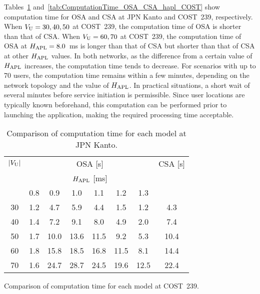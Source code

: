 \documentclass[10pt, letterpaper]{IEEEtran}
\begin{document}
\begin{CJK}{UTF8}{ipxm}
Tables~\ref{tab:ComputationTime_OSA_CSA_hapl_JPN} and~\ref{tab:ComputationTime_OSA_CSA_hapl_COST} show computation time for OSA and CSA at JPN Kanto and COST~239, respectively.
When $V_{\rm U} = 30, 40, 50$ at COST~239, the computation time of OSA is shorter than that of CSA.
When $V_{\rm U} = 60, 70$ at COST~239, the computation time of OSA at $H_{\rm APL} = 8.0$~ms is longer than that of CSA but shorter than that of CSA at other $H_{\rm APL}$ values.
In both networks, as the difference from a certain value of $H_{\rm APL}$ increases, the computation time tends to decrease.
For scenarios with up to 70 users, the computation time remains within a few minutes, depending on the network topology and the value of $H_{\rm APL}$. 
In practical situations, a short wait of several minutes before service initiation is permissible.
Since user locations are typically known beforehand, this computation can be performed prior to launching the application, making the required processing time acceptable.
\begin{table}[t]
  \caption{Comparison of computation time for each model at JPN Kanto.}
  \label{tab:ComputationTime_OSA_CSA_hapl_JPN}
  \begin{center}
    \begin{tabular}{c|cccccc|c}
      \hline
      $|V_{\rm{U}}|$ & \multicolumn{6}{c|}{OSA [s]} & CSA [s] \\ \cline{2-7}
       & \multicolumn{6}{c|}{$H_{\rm{APL}}$ [ms]} & \\
       & 0.8 & 0.9 & 1.0 & 1.1 & 1.2 & 1.3 &  \\
      \hline
      30 & 1.2 &  4.7 &  5.9 &  4.4 &  1.5 &  1.2 &  4.3 \\
      40 & 1.4 &  7.2 &  9.1 &  8.0 &  4.9 &  2.0 &  7.4 \\
      50 & 1.7 & 10.0 & 13.6 & 11.5 &  9.2 &  5.3 & 10.4 \\
      60 & 1.8 & 15.8 & 18.5 & 16.8 & 11.5 &  8.1 & 14.4 \\
      70 & 1.6 & 24.7 & 28.7 & 24.5 & 19.6 & 12.5 & 22.4 \\
      \hline
    \end{tabular}
  \end{center}
\end{table}
\begin{table}[t]
  \caption{Comparison of computation time for each model at COST~239.}
  \label{tab:ComputationTime_OSA_CSA_hapl_COST}

\end{table}
\end{CJK}
\end{document}
